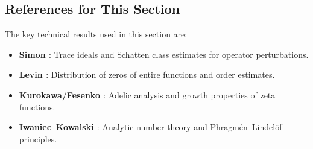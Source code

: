 \subsection{References for This Section}

The key technical results used in this section are:
\begin{itemize}
\item \textbf{Simon \cite{simon2005}}: Trace ideals and Schatten class estimates for operator perturbations.
\item \textbf{Levin \cite{levin1996}}: Distribution of zeros of entire functions and order estimates.
\item \textbf{Kurokawa/Fesenko \cite{fesenko2021}}: Adelic analysis and growth properties of zeta functions.
\item \textbf{Iwaniec–Kowalski \cite{IK2004}}: Analytic number theory and Phragmén–Lindelöf principles.
\end{itemize}
